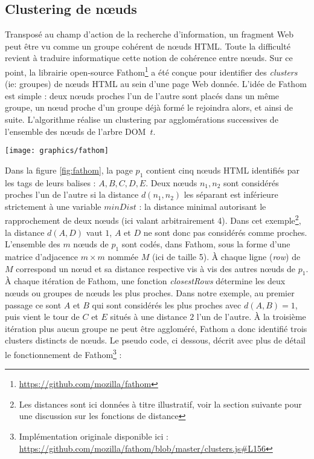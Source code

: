 \documentclass[symmetric,justified,marginals=raggedouter]{tufte-book}
\begin{document}
\subsection{Clustering de nœuds}

\noindent Transposé au champ d'action de la recherche d'information, un fragment Web peut être vu comme un groupe cohérent de nœuds HTML. Toute la difficulté revient à traduire informatique cette notion de cohérence entre nœuds. Sur ce point, la librairie open-source Fathom\footnote{\url{https://github.com/mozilla/fathom}} a été conçue pour identifier des \textit{clusters} (ie: groupes) de nœuds HTML au sein d'une page Web donnée. L'idée de Fathom est simple : deux nœuds proches l'un de l'autre sont placés dans un même groupe, un nœud proche d'un groupe déjà formé le rejoindra alors, et ainsi de suite. L'algorithme réalise un clustering par agglomérations successives de l'ensemble des nœuds de l'arbre DOM~$t$. 

\begin{figure*}%
  \texttt{[image: graphics/fathom]}
  \caption{Processus de nettoyage, nœud par nœud, d'une page Web}
  \label{fig:fathom}
\end{figure*}

\noindent Dans la figure \ref{fig:fathom}, la page $p_1$ contient cinq nœuds HTML identifiés par les tags de leurs balises : $A, B, C, D, E$. Deux nœuds $n_1, n_2$ sont considérés proches l'un de l'autre si la distance $d(n_1,n_2)$ les séparant est inférieure strictement à une variable $minDist$ : la distance minimal autorisant le rapprochement de deux nœuds (ici valant arbitrairement 4). Dans cet exemple\footnote{Les distances sont ici données à titre illustratif, voir la section suivante pour une discussion sur les fonctions de distance}, la distance $d(A,D)$ vaut $1$, $A$ et $D$ ne sont donc pas considérés comme proches. L'ensemble des $m$ nœuds de $p_1$ sont codés, dans Fathom, sous la forme d'une matrice d'adjacence $m \times m$ nommée $M$ (ici de taille 5). À chaque ligne (\textit{row}) de $M$ correspond un nœud et sa distance respective vis à vis des autres nœuds de $p_1$. À chaque itération de Fathom, une fonction \textit{closestRows} détermine les deux nœuds ou groupes de nœuds les plus proches. Dans notre exemple, au premier passage ce sont $A$ et $B$ qui sont considérés les plus proches avec $d(A,B)=1$, puis vient le tour de $C$ et $E$ situés à une distance $2$ l'un de l'autre. À la troisième itération plus aucun groupe ne peut être aggloméré, Fathom a donc identifié trois clusters distincts de nœuds. Le pseudo code, ci dessous, décrit avec plus de détail le fonctionnement de Fathom\footnote{Implémentation originale disponible ici : \url{https://github.com/mozilla/fathom/blob/master/clusters.js\#L156}} :  
\end{document}
